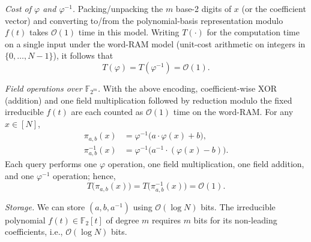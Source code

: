 \documentclass[journal]{IEEEtran}
\theoremstyle{definition}
\theoremstyle{definition}
\newcommand{\bigO}{\mathcal{O}}
\begin{document}
\emph{Cost of \(\varphi\) and \(\varphi^{-1}\).}
Packing/unpacking the \(m\) base\mbox{-}2 digits of \(x\) (or the coefficient vector) and converting to/from the polynomial\mbox{-}basis representation modulo \(f(t)\) takes \(\bigO(1)\) time in this model.
Writing \(T(\cdot)\) for the computation time on a single input under the word\mbox{-}RAM model (unit\mbox{-}cost arithmetic on integers in \(\{0,\dots,N-1\}\)), it follows that
\[
T(\varphi)=T(\varphi^{-1})=\bigO(1).
\]

\emph{Field operations over \(\mathbb{F}_{2^m}\).}
With the above encoding, coefficient\mbox{-}wise XOR (addition) and one field multiplication followed by reduction modulo the fixed irreducible \(f(t)\) are each counted as \(\bigO(1)\) time on the word\mbox{-}RAM.
For any \(x\in[N]\),
\begin{align*}
    \pi_{a,b}(x) &= \varphi^{-1}\big(a\cdot \varphi(x)+b\big), \\
    \pi_{a,b}^{-1}(x) &= \varphi^{-1}\big(a^{-1}\cdot(\varphi(x)-b)\big).
\end{align*}
Each query performs one \(\varphi\) operation, one field multiplication, one field addition, and one \(\varphi^{-1}\) operation; hence,
\[
T\big(\pi_{a,b}(x)\big)=T\big(\pi_{a,b}^{-1}(x)\big)=\bigO(1).
\]

\emph{Storage.}
We can store \((a,b,a^{-1})\) using \(\bigO(\log N)\) bits.
The irreducible polynomial \(f(t)\in\mathbb{F}_2[t]\) of degree \(m\) requires \(m\) bits for its non\mbox{-}leading coefficients, i.e., \(\bigO(\log N)\) bits.  %




 



\end{document}
